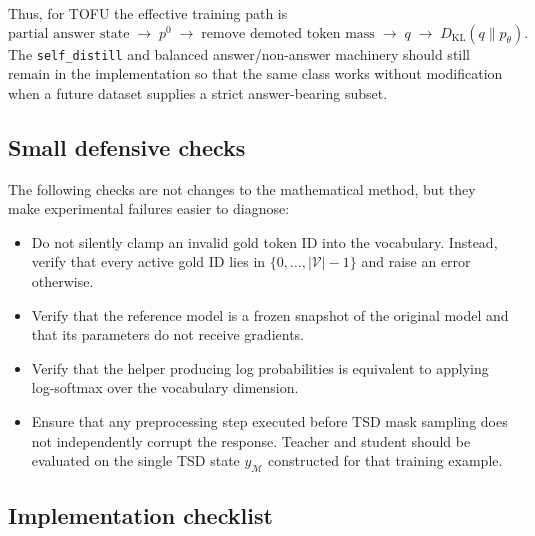 \documentclass{article}
\newcommand{\V}{\mathcal{V}}
\newcommand{\Mset}{\mathcal{M}}
\newcommand{\KL}{D_{\mathrm{KL}}}
\begin{document}
Thus, for TOFU the effective training path is
\begin{equation}
\boxed{
\text{partial answer state}
\;\longrightarrow\;
 p^0
\;\longrightarrow\;
 \text{remove demoted token mass}
\;\longrightarrow\;
 q
\;\longrightarrow\;
 \KL(q\|p_\theta).
}
\end{equation}
The \texttt{self\_distill} and balanced answer/non-answer machinery should still
remain in the implementation so that the same class works without modification
when a future dataset supplies a strict answer-bearing subset.

\subsection{Small defensive checks}

The following checks are not changes to the mathematical method, but they make
experimental failures easier to diagnose:
\begin{itemize}[leftmargin=*]
    \item Do not silently clamp an invalid gold token ID into the vocabulary.
    Instead, verify that every active gold ID lies in
    $\{0,\ldots,|\V|-1\}$ and raise an error otherwise.
    \item Verify that the reference model is a frozen snapshot of the original
    model and that its parameters do not receive gradients.
    \item Verify that the helper producing log probabilities is equivalent to
    applying log-softmax over the vocabulary dimension.
    \item Ensure that any preprocessing step executed before TSD mask sampling
    does not independently corrupt the response.  Teacher and student should be
    evaluated on the single TSD state $y_{\Mset}$ constructed for that training
    example.
\end{itemize}

\subsection{Implementation checklist}
\end{document}
